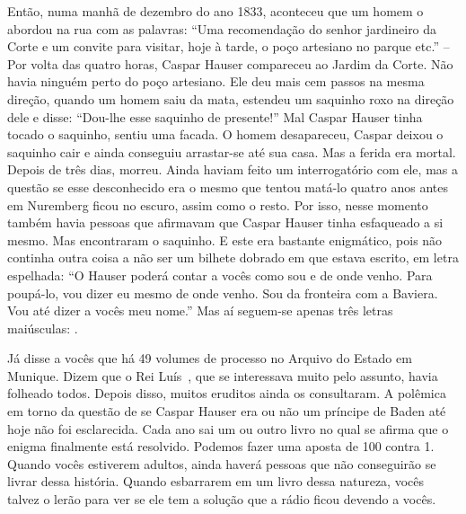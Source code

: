 Então, numa manhã de dezembro do ano 1833, aconteceu que um homem o
abordou na rua com as palavras: ``Uma recomendação do senhor jardineiro
da Corte e um convite para visitar, hoje à tarde, o poço artesiano no
parque etc.'' -- Por volta das quatro horas, Caspar Hauser compareceu ao
Jardim da Corte. Não havia ninguém perto do poço artesiano. Ele deu mais
cem passos na mesma direção, quando um homem saiu da mata, estendeu um
saquinho roxo na direção dele e disse: ``Dou-lhe esse saquinho de
presente!'' Mal Caspar Hauser tinha tocado o saquinho, sentiu uma
facada. O homem desapareceu, Caspar deixou o saquinho cair e ainda
conseguiu arrastar-se até sua casa. Mas a ferida era mortal. Depois de
três dias, morreu. Ainda haviam feito um interrogatório com ele, mas a
questão se esse desconhecido era o mesmo que tentou matá-lo quatro anos
antes em Nuremberg ficou no escuro, assim como o resto. Por isso, nesse
momento também havia pessoas que afirmavam que Caspar Hauser tinha
esfaqueado a si mesmo. Mas encontraram o saquinho. E este era bastante
enigmático, pois não continha outra coisa a não ser um bilhete dobrado
em que estava escrito, em letra espelhada: ``O Hauser poderá contar a
vocês como sou e de onde venho. Para poupá-lo, vou dizer eu mesmo de
onde venho. Sou da fronteira com a Baviera. Vou até dizer a vocês meu
nome.'' Mas aí seguem-se apenas três letras maiúsculas: .

Já disse a vocês que há 49 volumes de processo no Arquivo do Estado em
Munique. Dizem que o Rei Luís~, que se interessava muito pelo assunto,
havia folheado todos. Depois disso, muitos eruditos ainda os
consultaram. A polêmica em torno da questão de se Caspar Hauser era ou não
um príncipe de Baden até hoje não foi esclarecida. Cada ano sai um ou
outro livro no qual se afirma que o enigma finalmente está resolvido.
Podemos fazer uma aposta de 100 contra 1. Quando vocês estiverem
adultos, ainda haverá pessoas que não conseguirão se livrar dessa
história. Quando esbarrarem em um livro dessa natureza, vocês talvez o
lerão para ver se ele tem a solução que a rádio ficou devendo a vocês.




